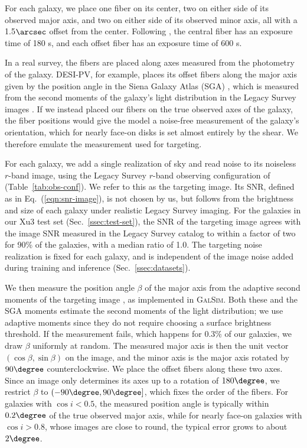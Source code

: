 For each galaxy, we place one fiber on its center, two on either side of its observed major axis, and two on either side of its observed minor axis, all with a 1.5$\arcsec$ offset from the center. Following \citep{KLDESI}, the central fiber has an exposure time of 180 s, and each offset fiber has an exposure time of 600 s.

In a real survey, the fibers are placed along axes measured from the photometry of the galaxy. DESI-PV, for example, places its offset fibers along the major axis given by the position angle in the Siena Galaxy Atlas (SGA) \citep{DESIPVTargetSel2023}, which is measured from the second moments of the galaxy's light distribution in the Legacy Survey images \citep{SGA2020}. If we instead placed our fibers on the true observed axes of the galaxy, the fiber positions would give the model a noise-free measurement of the galaxy's orientation, which for nearly face-on disks is set almost entirely by the shear. We therefore emulate the measurement used for targeting.

For each galaxy, we add a single realization of sky and read noise to its noiseless $r$-band image, using the Legacy Survey $r$-band observing configuration of \citep{KLDESI} (Table~\ref{tab:obs-conf}). We refer to this as the targeting image. Its SNR, defined as in Eq.~(\ref{eqn:snr-image}), is not chosen by us, but follows from the brightness and size of each galaxy under realistic Legacy Survey imaging. For the galaxies in our Xu3 test set (Sec.~\ref{ssec:test-set}), the SNR of the targeting image agrees with the image SNR measured in the Legacy Survey catalog to within a factor of two for 90\% of the galaxies, with a median ratio of 1.0. The targeting noise realization is fixed for each galaxy, and is independent of the image noise added during training and inference (Sec.~\ref{ssec:datasets}).

We then measure the position angle $\beta$ of the major axis from the adaptive second moments of the targeting image \citep{Hirata2003, Mandelbaum2005}, as implemented in \textsc{GalSim}. Both these and the SGA moments estimate the second moments of the light distribution; we use adaptive moments since they do not require choosing a surface brightness threshold. If the measurement fails, which happens for 0.3\% of our galaxies, we draw $\beta$ uniformly at random. The measured major axis is then the unit vector $(\cos\beta, \sin\beta)$ on the image, and the minor axis is the major axis rotated by $90\degree$ counterclockwise. We place the offset fibers along these two axes. Since an image only determines its axes up to a rotation of $180\degree$, we restrict $\beta$ to $(-90\degree, 90\degree]$, which fixes the order of the fibers. For galaxies with $\cos i < 0.5$, the measured position angle is typically within $0.2\degree$ of the true observed major axis, while for nearly face-on galaxies with $\cos i > 0.8$, whose images are close to round, the typical error grows to about $2\degree$.

